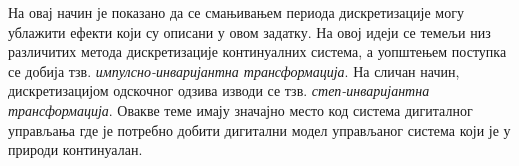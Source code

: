 На овај начин је показано да се смањивањем периода дискретизације могу ублажити ефекти који су описани у овом задатку. 
На овој идеји се темељи низ различитих метода дискретизације континуалних система, а уопштењем поступка се добија тзв. 
\textit{импулсно-инваријантна трансформација}. На сличан начин, дискретизацијом одскочног одзива изводи се 
тзв. \textit{степ-инваријантна трансформација}. Овакве теме имају значајно место код система дигиталног управљања где је потребно добити 
дигитални модел управљаног система који је у природи континуалан. 
